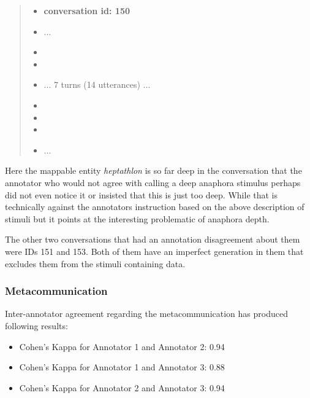 \begin{quote}
\begin{itemize}[label={}, leftmargin=0pt, itemsep=0.5em]
\item \textbf{conversation id: 150}
\item ...
\item {}
\item {}
\item ... 7 turns (14 utterances) ...
\item {}
\item {}
\item {}
\item ...
\end{itemize}
\end{quote}

Here the mappable entity \textit{heptathlon} is so far deep in the conversation that
the annotator who would not agree with calling a deep anaphora stimulus
perhaps did not even notice it or insisted that this is just too deep.
While that is technically against the annotators instruction based on the above description of stimuli
but it points at the interesting problematic of anaphora depth.

The other two conversations that had an annotation disagreement about them were IDs 151 and 153.
Both of them have an imperfect generation in them that excludes them from the stimuli containing data.

\subsubsection{Metacommunication}

Inter-annotator agreement regarding the metacommunication has produced following results:

\begin{itemize}[label={}]
\item Cohen's Kappa for Annotator 1 and Annotator 2: 0.94
\item Cohen's Kappa for Annotator 1 and Annotator 3: 0.88
\item Cohen's Kappa for Annotator 2 and Annotator 3: 0.94
\end{itemize}

